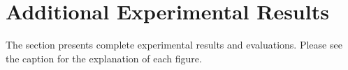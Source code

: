 \section{Additional Experimental Results} \label{section:supple:results}

The section presents complete experimental results and evaluations.
Please see the caption for the explanation of each figure.





